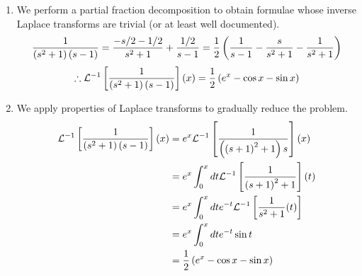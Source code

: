 \item

\begin{enumerate}[wide, labelindent = 0pt, label = (Solution \arabic*)]
\item
We perform a partial fraction decomposition to obtain formulae
whose inverse Laplace transforms are trivial (or at least well documented).
\[
    \frac{1}{\left( s^2 + 1 \right) (s - 1)}
    = \frac{-s/2 - 1/2}{s^2 + 1} + \frac{1/2}{s - 1}
    = \frac{1}{2} \left( \frac{1}{s - 1} - \frac{s}{s^2 + 1} - \frac{1}{s^2 +1} \right)
\]
\[
    \therefore \mathcal{L}^{-1}\left[ \frac{1}{\left( s^2 + 1 \right) (s - 1)} \right](x)
    = \frac{1}{2} \left( e^x - \cos x - \sin x \right)
\]

\item
We apply properties of Laplace transforms to gradually reduce the problem.
\begin{align*}
    \mathcal{L}^{-1}\left[ \frac{1}{\left( s^2 + 1 \right) (s - 1)} \right](x)
    &= e^x \mathcal{L}^{-1}\left[ \frac{1}{\left( {(s + 1)}^2 + 1 \right) s} \right](x) \\
    &= e^x \int_0^x dt \mathcal{L}^{-1}\left[ \frac{1}{{(s + 1)}^2 + 1} \right](t) \\
    &= e^x \int_0^x dt e^{-t} \mathcal{L}^{-1}\left[ \frac{1}{s^2 + 1}(t) \right] \\
    &= e^x \int_0^x dt e^{-t} \sin t \\
    &= \frac{1}{2} \left( e^x - \cos x - \sin x \right)
\end{align*}

\end{enumerate}